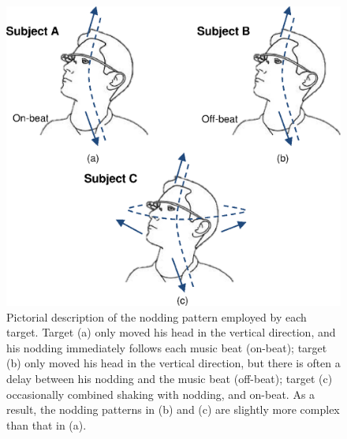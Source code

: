 \begin{figure}
\vspace{-1mm}
\centering
\includegraphics[width = .85\columnwidth]{figure/imitation_subject_movement.eps}
\caption{\label{fig:imitation_movement} Pictorial description of the nodding pattern employed by each target. Target (a) only moved his head in the vertical direction, and his nodding immediately follows each music beat (on-beat); target (b) only moved his head in the vertical direction, but there is often a delay between his nodding and the music beat (off-beat); target (c) occasionally combined shaking with nodding, and on-beat. As a result, the nodding patterns in (b) and (c) are slightly more complex than that in (a). }
\vspace{-1mm}
\end{figure}

 